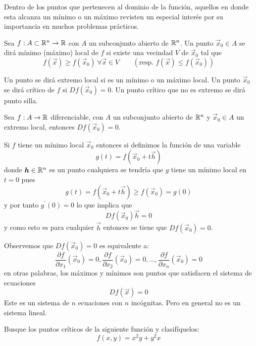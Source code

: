 Dentro de los puntos que pertenecen al dominio de la funci\'on, aquellos en
donde esta alcanza un m\'inimo o un m\'aximo revisten un especial
inter\'es por su importancia en muchos problemas pr\'acticos.
\begin{definicion}
Sea $f:A\subset \mathbb{R}^n \to \mathbb{R}$ con $A$ un subconjunto abierto de $\mathbb{R}^{n}$. Un
punto $\vec{x}_{0}\in A$ se dir\'a m\'inimo (m\'aximo) local de $f$ si existe
una vecindad $V$ de $\vec{x}_{0}$ tal que
\[
f(\vec{x})\geq f(\vec{x}_{0})\:\forall \vec{x}\in V\qquad \left(\text{resp. }f(\vec{x})\leq f(\vec{x}_{0})\right)
\]
\end{definicion}
Un punto se dir\'a extremo local si es un m\'inimo o un m\'aximo local.
Un punto $\vec{x}_{0}$ se dir\'a cr\'itico de $f$ si $Df(\vec{x}_{0})=0$. Un
punto cr\'itico que no es extremo se dir\'a punto silla.
\begin{teorema}
Sea $f:A\rightarrow\mathbb{R}$ diferenciable, con $A$ un subconjunto abierto de
$\mathbb{R}^{n}$ y $\vec{x}_{0}\in A$ un extremo local, entonces $Df(\vec{x}_{0})=0$.
\end{teorema}
\begin{demostracion}
Si $f$ tiene un m\'inimo local $\vec{x}_{0}$ entonces si definimos la funci\'on
de una variable
\[
g(t)=f(\vec{x}_{0}+t\vec{h})
\]
donde $\boldsymbol{h}\in\mathbb{R}^{n}$ es un punto cualquiera se tendr\'ia que $g$ tiene un
m\'inimo local en $t=0$ pues
\[
g(t)=f(\vec{x}_{0}+t\vec{h})\geq f\left(\vec{x}_{0}\right)  =g\left(0\right)
\]
y por tanto $g^{\prime}(0)=0$ lo que implica que
\[
Df(\vec{x}_{0})\vec{h}=0
\]
y como esto es para cualquier $\vec{h}$ entonces se tiene que $Df(\vec{x}_{0})=0$.
\end{demostracion}

\medskip

Observemos que $Df(\vec{x}_{0})=0$ es equivalente a:
\[
\frac{\partial f}{\partial x_{1}}(\vec{x}_{0})=0,\frac{\partial f}{\partial x_{2}%
}(\vec{x}_{0})=0,\ldots,\frac{\partial f}{\partial x_{n}}(\vec{x}_{0})=0
\]
en otras palabras, los m\'aximos y m\'inimos son puntos que satisfacen el
sistema de ecuaciones
\[
Df(\vec{x})=0
\]
Este es un sistema de $n$ ecuaciones con $n$ inc\'ognitas. Pero en general
no es un sistema lineal.
\begin{ejemplo}
Busque los puntos cr\'iticos de la siguiente funci\'on y
clasif\'iquelos:
\[
f(x,y)=x^{2}y+y^{2}x
\]
\end{ejemplo}

